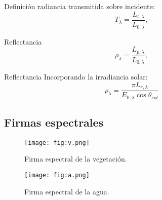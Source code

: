 \begin{frame}{}
    \begin{block}{Definición}
       radiancia transmitida sobre incidente:
        \begin{equation}
         T_\lambda = \frac{L_{t,\lambda}}{L_{0,\lambda}} ,
        \end{equation}
         \end{block}
\end{frame}








\begin{frame}{}
    \begin{block}{Reflectancia}
               \begin{equation}
         \rho_\lambda = \frac{L_{p,\lambda}}{L_{0,\lambda}} ,
        \end{equation}
         \end{block}
\end{frame}


\begin{frame}{}
    \begin{block}{Reflectancia}
        Incorporando la irradiancia solar:
        \begin{equation}
          \rho_\lambda = \frac{\pi L_{r,\lambda}}{E_{0,\lambda} \cos \theta_{sol}}
        \end{equation}
    \end{block}
\end{frame}

\subsection{Firmas espectrales}

\begin{frame}{}
  \begin{figure}
    \centering
    \texttt{[image: fig:v.png]}
    \caption{Firma espectral de la vegetación.}
    \label{}
  \end{figure}
\end{frame}

\begin{frame}{}
  \begin{figure}
    \centering
    \texttt{[image: fig:a.png]}
    \caption{Firma espectral de la agua.}
    \label{}
  \end{figure}
\end{frame}

